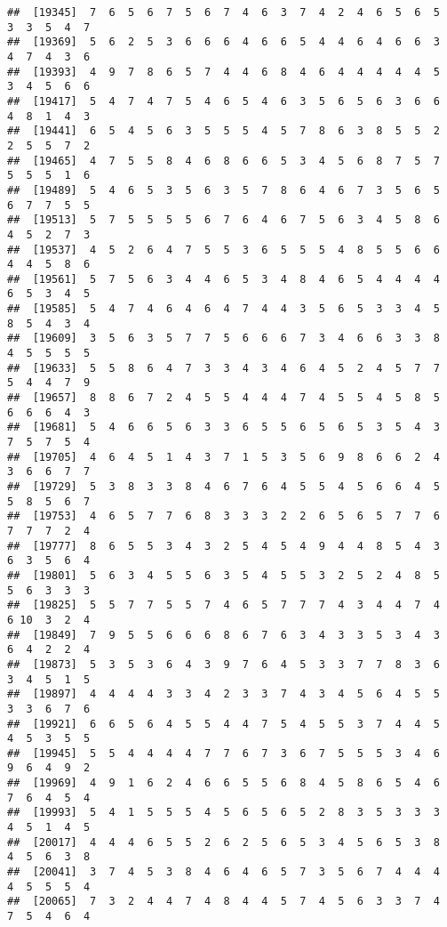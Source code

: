 \documentclass[
]{book}
\begin{document}
\begin{verbatim}
##  [19345]  7  6  5  6  7  5  6  7  4  6  3  7  4  2  4  6  5  6  5  3  3  5  4  7
##  [19369]  5  6  2  5  3  6  6  6  4  6  6  5  4  4  6  4  6  6  3  4  7  4  3  6
##  [19393]  4  9  7  8  6  5  7  4  4  6  8  4  6  4  4  4  4  4  5  3  4  5  6  6
##  [19417]  5  4  7  4  7  5  4  6  5  4  6  3  5  6  5  6  3  6  6  4  8  1  4  3
##  [19441]  6  5  4  5  6  3  5  5  5  4  5  7  8  6  3  8  5  5  2  2  5  5  7  2
##  [19465]  4  7  5  5  8  4  6  8  6  6  5  3  4  5  6  8  7  5  7  5  5  5  1  6
##  [19489]  5  4  6  5  3  5  6  3  5  7  8  6  4  6  7  3  5  6  5  6  7  7  5  5
##  [19513]  5  7  5  5  5  5  6  7  6  4  6  7  5  6  3  4  5  8  6  4  5  2  7  3
##  [19537]  4  5  2  6  4  7  5  5  3  6  5  5  5  4  8  5  5  6  6  4  4  5  8  6
##  [19561]  5  7  5  6  3  4  4  6  5  3  4  8  4  6  5  4  4  4  4  6  5  3  4  5
##  [19585]  5  4  7  4  6  4  6  4  7  4  4  3  5  6  5  3  3  4  5  8  5  4  3  4
##  [19609]  3  5  6  3  5  7  7  5  6  6  6  7  3  4  6  6  3  3  8  4  5  5  5  5
##  [19633]  5  5  8  6  4  7  3  3  4  3  4  6  4  5  2  4  5  7  7  5  4  4  7  9
##  [19657]  8  8  6  7  2  4  5  5  4  4  4  7  4  5  5  4  5  8  5  6  6  6  4  3
##  [19681]  5  4  6  6  5  6  3  3  6  5  5  6  5  6  5  3  5  4  3  7  5  7  5  4
##  [19705]  4  6  4  5  1  4  3  7  1  5  3  5  6  9  8  6  6  2  4  3  6  6  7  7
##  [19729]  5  3  8  3  3  8  4  6  7  6  4  5  5  4  5  6  6  4  5  5  8  5  6  7
##  [19753]  4  6  5  7  7  6  8  3  3  3  2  2  6  5  6  5  7  7  6  7  7  7  2  4
##  [19777]  8  6  5  5  3  4  3  2  5  4  5  4  9  4  4  8  5  4  3  6  3  5  6  4
##  [19801]  5  6  3  4  5  5  6  3  5  4  5  5  3  2  5  2  4  8  5  5  6  3  3  3
##  [19825]  5  5  7  7  5  5  7  4  6  5  7  7  7  4  3  4  4  7  4  6 10  3  2  4
##  [19849]  7  9  5  5  6  6  6  8  6  7  6  3  4  3  3  5  3  4  3  6  4  2  2  4
##  [19873]  5  3  5  3  6  4  3  9  7  6  4  5  3  3  7  7  8  3  6  3  4  5  1  5
##  [19897]  4  4  4  4  3  3  4  2  3  3  7  4  3  4  5  6  4  5  5  3  3  6  7  6
##  [19921]  6  6  5  6  4  5  5  4  4  7  5  4  5  5  3  7  4  4  5  4  5  3  5  5
##  [19945]  5  5  4  4  4  4  7  7  6  7  3  6  7  5  5  5  3  4  6  9  6  4  9  2
##  [19969]  4  9  1  6  2  4  6  6  5  5  6  8  4  5  8  6  5  4  6  7  6  4  5  4
##  [19993]  5  4  1  5  5  5  4  5  6  5  6  5  2  8  3  5  3  3  3  4  5  1  4  5
##  [20017]  4  4  4  6  5  5  2  6  2  5  6  5  3  4  5  6  5  3  8  4  5  6  3  8
##  [20041]  3  7  4  5  3  8  4  6  4  6  5  7  3  5  6  7  4  4  4  4  5  5  5  4
##  [20065]  7  3  2  4  4  7  4  8  4  4  5  7  4  5  6  3  3  7  4  7  5  4  6  4

\end{verbatim}
\end{document}
